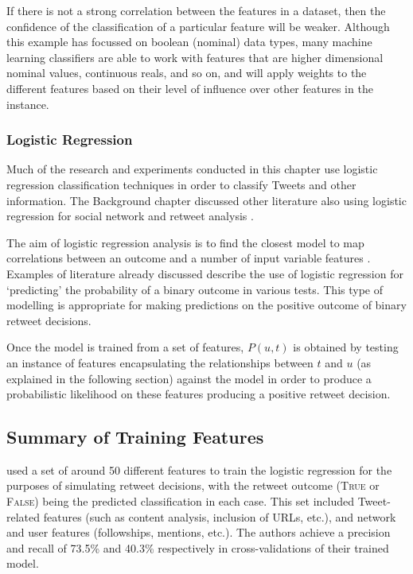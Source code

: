 If there is not a strong correlation between the features in a dataset, then the confidence of the classification of a particular feature will be weaker. Although this example has focussed on boolean (nominal) data types, many machine learning classifiers are able to work with features that are higher dimensional nominal values, continuous reals, and so on, and will apply weights to the different features based on their level of influence over other features in the instance.


\subsubsection{Logistic Regression}
\label{section:logistic_regression}
Much of the research and experiments conducted in this chapter use logistic regression classification techniques in order to classify Tweets and other information. The Background chapter discussed other literature also using logistic regression for social network and retweet analysis \cite{castillo11, zhu11, peng11, naveed11, hong11}.

The aim of logistic regression analysis is to find the closest model to map correlations between an outcome and a number of input variable features \cite{hosmer13}. Examples of literature already discussed describe the use of logistic regression for `predicting' the probability of a binary outcome in various tests. This type of modelling is appropriate for making predictions on the positive outcome of binary retweet decisions.

Once the model is trained from a set of features, $P(u,t)$ is obtained by testing an instance of features encapsulating the relationships between $t$ and $u$ (as explained in the following section) against the model in order to produce a probabilistic likelihood on these features producing a positive retweet decision. 


\subsection{Summary of Training Features}
\citet{zhu11} used a set of around 50 different features to train the logistic regression for the purposes of simulating retweet decisions, with the retweet outcome (\textsc{True} or \textsc{False}) being the predicted classification in each case. This set included Tweet-related features (such as content analysis, inclusion of URLs, etc.), and network and user features (followships, mentions, etc.). The authors achieve a precision and recall of 73.5\% and 40.3\% respectively in cross-validations of their trained model.

